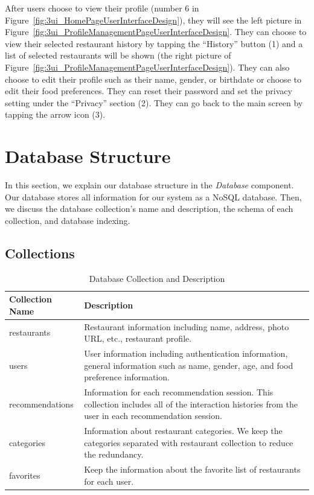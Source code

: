 \documentclass[12pt,oneside,openright,a4paper]{cpe-english-project}
\begin{document}
After users choose to view their profile (number 6 in Figure~\ref{fig:3ui_HomePageUserInterfaceDesign}), they will see the left picture in Figure~\ref{fig:3ui_ProfileManagementPageUserInterfaceDesign}. They can choose to view their selected restaurant history by tapping the “History” button (1) and a list of selected restaurants will be shown (the right picture of Figure~\ref{fig:3ui_ProfileManagementPageUserInterfaceDesign}). They can also choose to edit their profile such as their name, gender, or birthdate or choose to edit their food preferences. They can reset their password and set the privacy setting under the “Privacy” section (2). They can go back to the main screen by tapping the arrow icon (3).


\section{Database Structure} \label{sec:databasestructure}
In this section, we explain our database structure in the \textit{Database} component. Our database stores all information for our system as a NoSQL database. Then, we discuss the database collection’s name and description, the schema of each collection, and database indexing.

\newpage
\subsection{Collections}
\begin{table}[H]
\caption{Database Collection and Description}\label{tbl:3DatabaseCollectionandDescription}
\begin{tabularx}{\textwidth}{l|X} \hline\hline
Collection Name & Description \\ \hline\hline
restaurants & Restaurant information including name, address, photo URL, etc., restaurant profile. \\ \hline
users & User information including authentication information, general information such as name, gender, age, and food preference information. \\ \hline
recommendations & Information for each recommendation session. This collection includes all of the interaction histories from the user in each recommendation session. \\ \hline
categories & Information about restaurant categories. We keep the categories separated with restaurant collection to reduce the redundancy. \\ \hline
favorites & Keep the information about the favorite list of restaurants for each user. \\ \hline\hline
\end{tabularx}
\end{table}
\end{document}
